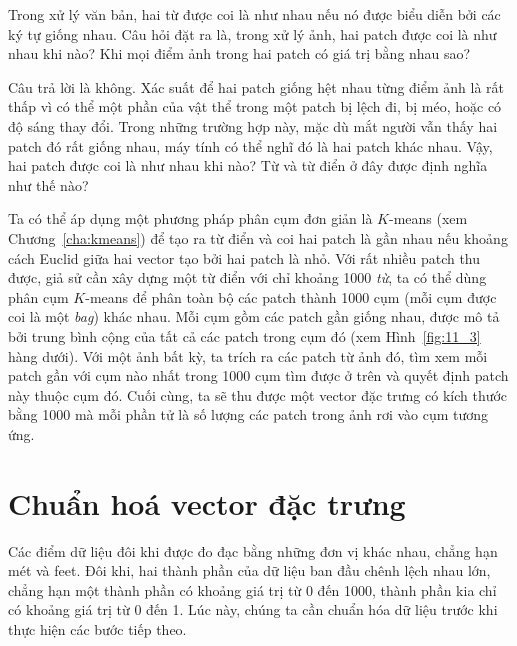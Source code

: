 Trong xử lý văn bản, hai từ được coi là như nhau nếu nó được biểu diễn bởi các
ký tự giống nhau. Câu hỏi đặt ra là, trong xử lý ảnh, hai patch được coi là như
nhau khi nào? Khi mọi điểm ảnh trong hai patch có giá trị bằng nhau sao?

Câu trả lời là không. Xác suất để hai patch giống hệt nhau từng điểm ảnh là rất
thấp vì có thể một phần của vật thể trong một patch bị lệch đi, bị
méo, hoặc có độ sáng thay đổi. Trong những trường hợp này, mặc dù mắt người vẫn
thấy hai patch đó {rất giống nhau}, máy tính có thể nghĩ đó là hai patch
khác nhau. Vậy, hai patch được coi là như nhau khi nào? Từ và {từ điển} ở
đây được định nghĩa như thế nào?


Ta có thể áp dụng một phương pháp phân cụm đơn giản là $K$-means
(xem Chương~\ref{cha:kmeans}) để tạo ra từ điển và coi hai patch là gần nhau nếu
khoảng cách Euclid giữa hai vector tạo bởi hai patch là nhỏ. Với rất nhiều patch
thu được, giả sử cần xây dựng một từ điển với chỉ khoảng 1000 \textit{từ}, ta có
thể dùng phân cụm $K$-means để phân toàn bộ các patch thành 1000 cụm (mỗi
cụm được coi là một \textit{bag}) khác nhau. Mỗi cụm gồm các patch gần giống
nhau, được mô tả bởi trung bình cộng của tất cả các patch trong cụm đó (xem
Hình~\ref{fig:11_3} hàng dưới). Với một ảnh bất kỳ, ta trích ra các patch từ ảnh
đó, tìm xem mỗi patch gần với cụm nào nhất trong 1000 cụm tìm được ở trên và
quyết định patch này thuộc cụm đó. Cuối cùng, ta sẽ thu được một vector đặc
trưng có kích thước bằng 1000 mà mỗi phần tử là số lượng các patch trong ảnh rơi
vào cụm tương ứng.


\section{Chuẩn hoá vector đặc trưng}

Các điểm dữ liệu đôi khi được đo đạc bằng những đơn vị khác nhau, chẳng hạn mét
và feet. Đôi khi, hai thành phần của dữ liệu ban đầu chênh lệch nhau lớn, chẳng
hạn một thành phần có khoảng giá trị từ 0 đến 1000, thành phần kia chỉ có khoảng
giá trị từ 0 đến 1. Lúc này, chúng ta cần chuẩn hóa dữ liệu trước khi thực hiện
các bước tiếp theo.


